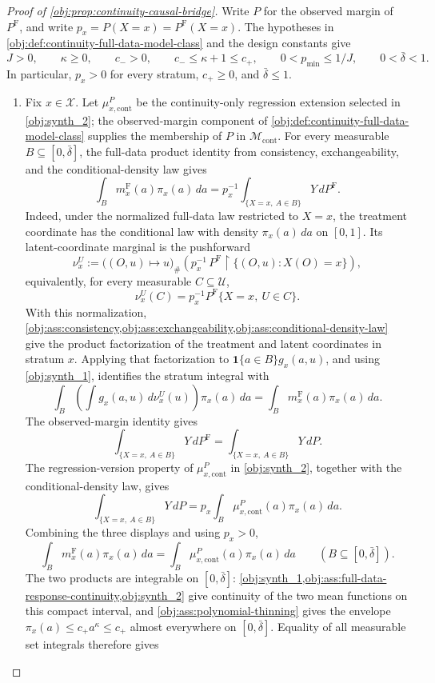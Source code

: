 \begin{proof}[Proof of \cref{obj:prop:continuity-causal-bridge}]
Write \(P\) for the observed margin of \(P^{\mathrm F}\), and write \(p_x=P(X=x)=P^{\mathrm F}(X=x)\).  The hypotheses in \cref{obj:def:continuity-full-data-model-class} and the design constants give
\[
J>0,\qquad \kappa\ge0,\qquad c_->0,\qquad c_-\le \kappa+1\le c_+,
\qquad 0<p_{\min}\le 1/J,
\qquad 0<\bar\delta<1.
\]
In particular, \(p_x>0\) for every stratum, \(c_+\ge0\), and \(\bar\delta\le1\).

\begin{enumerate}
\item Fix \(x\in\mathcal X\).  Let \(\mu_{x,\mathrm{cont}}^P\) be the continuity-only regression extension selected in \cref{obj:synth_2}; the observed-margin component of \cref{obj:def:continuity-full-data-model-class} supplies the membership of \(P\) in \(\mathcal M_{\mathrm{cont}}\).  For every measurable \(B\subseteq[0,\bar\delta]\), the full-data product identity from consistency, exchangeability, and the conditional-density law gives
\[
\int_B m_x^{\mathrm F}(a)\pi_x(a)\,da
=
p_x^{-1}\int_{\{X=x,\ A\in B\}}Y\,dP^{\mathrm F}.
\]
Indeed, under the normalized full-data law restricted to \(X=x\), the treatment coordinate has the conditional law with density \(\pi_x(a)\,da\) on \([0,1]\).  Its latent-coordinate marginal is the pushforward
\[
\nu_x^{U}
:=
\bigl((O,u)\mapsto u\bigr)_{\#}
\left(p_x^{-1}\,P^{\mathrm F}\!\restriction\{(O,u):X(O)=x\}\right),
\]
equivalently, for every measurable \(C\subseteq\mathcal U\),
\[
\nu_x^{U}(C)=p_x^{-1}P^{\mathrm F}\{X=x,\ U\in C\}.
\]
With this normalization, \cref{obj:ass:consistency,obj:ass:exchangeability,obj:ass:conditional-density-law} give the product factorization of the treatment and latent coordinates in stratum \(x\).  Applying that factorization to \(\mathbf 1\{a\in B\}g_x(a,u)\), and using \cref{obj:synth_1}, identifies the stratum integral with
\[
\int_B\left(\int g_x(a,u)\,d\nu_x^{U}(u)\right)\pi_x(a)\,da
=
\int_B m_x^{\mathrm F}(a)\pi_x(a)\,da .
\]
The observed-margin identity gives
\[
\int_{\{X=x,\ A\in B\}}Y\,dP^{\mathrm F}
=
\int_{\{X=x,\ A\in B\}}Y\,dP .
\]
The regression-version property of \(\mu_{x,\mathrm{cont}}^P\) in \cref{obj:synth_2}, together with the conditional-density law, gives
\[
\int_{\{X=x,\ A\in B\}}Y\,dP
=
p_x\int_B \mu_{x,\mathrm{cont}}^P(a)\pi_x(a)\,da .
\]
Combining the three displays and using \(p_x>0\),
\[
\int_B m_x^{\mathrm F}(a)\pi_x(a)\,da
=
\int_B \mu_{x,\mathrm{cont}}^P(a)\pi_x(a)\,da
\qquad
(B\subseteq[0,\bar\delta]).
\]
The two products are integrable on \([0,\bar\delta]\): \cref{obj:synth_1,obj:ass:full-data-response-continuity,obj:synth_2} give continuity of the two mean functions on this compact interval, and \cref{obj:ass:polynomial-thinning} gives the envelope \(\pi_x(a)\le c_+a^\kappa\le c_+\) almost everywhere on \([0,\bar\delta]\).  Equality of all measurable set integrals therefore gives

\end{enumerate}
\end{proof}
